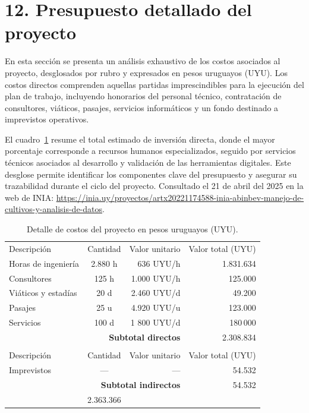 \documentclass[
11pt, %
]{charter}
\begin{document}
\section{12. Presupuesto detallado del proyecto}
\label{sec:presupuesto}
En esta sección se presenta un análisis exhaustivo de los costos asociados al proyecto, desglosados por rubro y expresados en pesos uruguayos (UYU). Los costos directos comprenden aquellas partidas imprescindibles para la ejecución del plan de trabajo, incluyendo honorarios del personal técnico, contratación de consultores, viáticos, pasajes, servicios informáticos y un fondo destinado a imprevistos operativos.

El cuadro~\ref{tab:costos_proyecto} resume el total estimado de inversión directa, donde el mayor porcentaje corresponde a recursos humanos especializados, seguido por servicios técnicos asociados al desarrollo y validación de las herramientas digitales. Este desglose permite identificar los componentes clave del presupuesto y asegurar su trazabilidad durante el ciclo del proyecto. Consultado el 21 de abril del 2025 en la web de INIA: 
\url{https://inia.uy/proyectos/artx20221174588-inia-abinbev-manejo-de-cultivos-y-analisis-de-datos}.

\begin{table}[htbp]
\centering
\caption{Detalle de costos del proyecto en pesos uruguayos (UYU).}
\label{tab:costos_proyecto}
\begin{tabularx}{\linewidth}{|X|c|r|r|}
\hline
\rowcolor[HTML]{C0C0C0}
\multicolumn{4}{|c|}{\textbf{COSTOS DIRECTOS}} \\
\hline
\rowcolor[HTML]{C0C0C0}
Descripción & Cantidad & Valor unitario & Valor total (UYU) \\
\hline
Horas de ingeniería        & 2.880 h &   636 UYU/h & 1.831.634 \\
Consultores                &   125 h  & 1.000 UYU/h &   125.000 \\
Viáticos y estadías        &    20 d  & 2.460 UYU/d  &    49.200 \\
Pasajes                    &    25 u  & 4.920 UYU/u  &   123.000 \\
Servicios     &   100 d  & 1 800 UYU/d  &   180\,000 \\
\hline
\multicolumn{3}{|r|}{\textbf{Subtotal directos}} & 2.308.834 \\
\hline
\rowcolor[HTML]{C0C0C0}
\multicolumn{4}{|c|}{\textbf{COSTOS INDIRECTOS}} \\
\hline
\rowcolor[HTML]{C0C0C0}
Descripción & Cantidad & Valor unitario & Valor total (UYU) \\
\hline
Imprevistos                 & —       & —           &    54.532 \\
\hline
\multicolumn{3}{|r|}{\textbf{Subtotal indirectos}} &    54.532 \\
\hline
\rowcolor[HTML]{C0C0C0}
\multicolumn{3}{|r|}{\textbf{TOTAL GENERAL}} & 2.363.366 \\
\hline
\end{tabularx}
\end{table}
\end{document}

